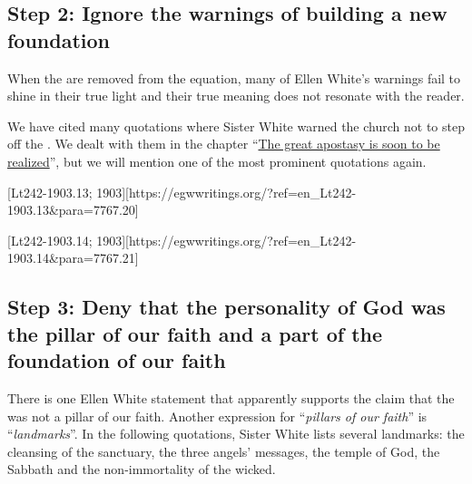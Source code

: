 \subsection*{Step 2: Ignore the warnings of building a new foundation}

When the  are removed from the equation, many of Ellen White’s warnings fail to shine in their true light and their true meaning does not resonate with the reader.

We have cited many quotations where Sister White warned the church not to step off the . We dealt with them in the chapter “\hyperref[chap:apostasy]{The great apostasy is soon to be realized}”, but we will mention one of the most prominent quotations again.

[Lt242-1903.13; 1903][https://egwwritings.org/?ref=en\_Lt242-1903.13&para=7767.20]

[Lt242-1903.14; 1903][https://egwwritings.org/?ref=en\_Lt242-1903.14&para=7767.21]

\subsection*{Step 3: Deny that the personality of God was the pillar of our faith and a part of the foundation of our faith}

There is one Ellen White statement that apparently supports the claim that the  was not a pillar of our faith. Another expression for “\textit{pillars of our faith}” is “\textit{landmarks}”. In the following quotations, Sister White lists several landmarks: the cleansing of the sanctuary, the three angels’ messages, the temple of God, the Sabbath and the non-immortality of the wicked.

